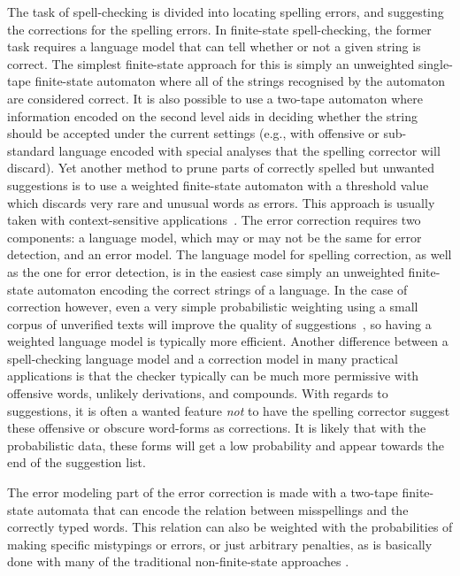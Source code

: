 \documentclass[a4paper,12pt]{article}
\begin{document}
The task of spell-checking is divided into locating spelling errors, and
suggesting the corrections for the spelling errors. In finite-state
spell-checking, the former task requires a language model that can tell whether
or not a given string is correct. The simplest finite-state approach for this
is simply an unweighted single-tape finite-state automaton where all of the
strings recognised by the automaton are considered correct. It is also possible
to use a two-tape automaton where information encoded on the second level aids
in deciding whether the string should be accepted under the current settings
(e.g., with offensive or sub-standard language encoded with special analyses
that the spelling corrector will discard). Yet another method to prune parts of
correctly spelled but unwanted suggestions is to use a weighted finite-state
automaton with a threshold value which discards very rare and unusual words as
errors. This approach is usually taken with context-sensitive
applications~\cite[]{otero/2007}. The error correction requires two components: a
language model, which may or may not be the same for error detection, and an
error model. The language model for spelling correction, as well as the one for
error detection, is in the easiest case simply an unweighted finite-state
automaton encoding the correct strings of a language. In the case of correction
however, even a very simple probabilistic weighting using a small corpus of
unverified texts will improve the quality of
suggestions~\cite[]{pirinen/2010/lrec}, so having a weighted language model is
typically more efficient. Another difference between a spell-checking language
model and a correction model in many practical applications is that the checker
typically can be much more permissive with offensive words, unlikely
derivations, and compounds.  With regards to suggestions, it is often a wanted
feature \emph{not} to have the spelling corrector suggest these offensive or
obscure word-forms as corrections. It is likely that with the probabilistic
data, these forms will get a low probability and appear towards the end of the
suggestion list.

The error modeling part of the error correction is made with a two-tape
finite-state automata that can encode the relation between misspellings and
the correctly typed words. This relation can also be weighted with the
probabilities of making specific mistypings or errors, or just arbitrary
penalties, as is basically done with many of the traditional non-finite-state
approaches \cite[such as][]{Hunspell/manual}.
\end{document}
